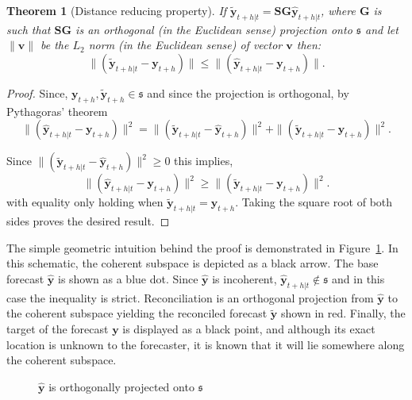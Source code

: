 \documentclass[12pt]{article}
\newtheorem{theo}{Theorem}[section]
\theoremstyle{definition}
\theoremstyle{property}
\begin{document}
	
	\begin{theo}[Distance reducing property]\label{th:distred}
		If $\tilde{\bm{y}}_{t+h|t}=\bm{S}\bm{G}\hat{\bm{y}}_{t+h|t}$, where $\bm{G}$ is such that $\bm{S}\bm{G}$ is an orthogonal (in the Euclidean sense) projection onto $\mathfrak{s}$ and let $\|\bm{v}\|$ be the $L_2$ norm (in the Euclidean sense) of vector $\bm{v}$ then:
		\begin{equation}
		\|(\tilde{\bm{y}}_{t+h|t}-\bm{y}_{t+h})\|\le\|(\hat{\bm{y}}_{t+h|t}-\bm{y}_{t+h})\|.
		\end{equation}
	\end{theo}
	\begin{proof}
		Since, $\bm{y}_{t+h},\tilde{\bm{y}}_{t+h}\in\mathfrak{s}$ and since the projection is orthogonal, by Pythagoras' theorem
		\begin{equation}
		\|(\hat{\bm{y}}_{t+h|t}-\bm{y}_{t+h})\|^2=\|(\tilde{\bm{y}}_{t+h|t}-\hat{\bm{y}}_{t+h})\|^2+\|(\tilde{\bm{y}}_{t+h|t}-\bm{y}_{t+h})\|^2.
		\end{equation}
		
		Since $\|(\tilde{\bm{y}}_{t+h|t}-\hat{\bm{y}}_{t+h})\|^2\ge 0$ this implies,
		\begin{equation}
		\|(\hat{\bm{y}}_{t+h|t}-\bm{y}_{t+h})\|^2\ge\|(\tilde{\bm{y}}_{t+h|t}-\bm{y}_{t+h})\|^2.
		\end{equation}
		with equality only holding when $\tilde{\bm{y}}_{t+h|t}=\hat{\bm{y}}_{t+h}$.  Taking the square root of both sides proves the desired result.
	\end{proof}
		
	The simple geometric intuition behind the proof is demonstrated in Figure~\ref{fig:Schematic_OLSRecon}.  In this schematic, the coherent subspace is depicted as a black arrow.  The base forecast $\hat{\bm{y}}$ is shown as a blue dot.  Since $\hat{\bm{y}}$ is incoherent, $\hat{\bm{y}}_{t+h|t}\notin\mathfrak{s}$ and in this case the inequality is strict.  Reconciliation is an orthogonal projection from $\hat{\bm{y}}$ to the coherent subspace yielding the reconciled forecast $\tilde{\bm{y}}$ shown in red.  Finally, the target of the forecast $\bm{y}$ is displayed as a black point, and although its exact location is unknown to the forecaster, it is known that it will lie somewhere along the coherent subspace.
	
	\begin{figure}[H]\label{fig:Schematic_OLSRecon}
		\centering
		\vspace{-0.9cm}
		\tiny
		\resizebox{\linewidth}{!}{}
		\caption{$\hat{\bm{y}}$ is orthogonally projected onto $\mathfrak{s}$}
		
	\end{figure}
	
\end{document}
